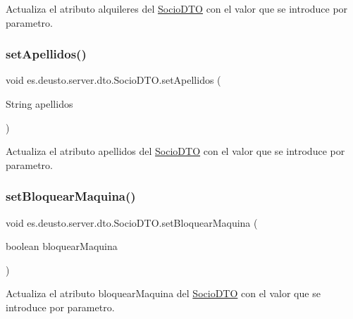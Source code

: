 Actualiza el atributo alquileres del \mbox{\hyperlink{classes_1_1deusto_1_1server_1_1dto_1_1_socio_d_t_o}{Socio\+D\+TO}} con el valor que se introduce por parametro. \mbox{\label{classes_1_1deusto_1_1server_1_1dto_1_1_socio_d_t_o_a16eb1e1b2b02afa38b38506b818a8786}} 
\subsubsection{\texorpdfstring{setApellidos()}{setApellidos()}}
{\footnotesize\ttfamily void es.\+deusto.\+server.\+dto.\+Socio\+D\+T\+O.\+set\+Apellidos (\begin{DoxyParamCaption}\item[{String}]{apellidos }\end{DoxyParamCaption})}

Actualiza el atributo apellidos del \mbox{\hyperlink{classes_1_1deusto_1_1server_1_1dto_1_1_socio_d_t_o}{Socio\+D\+TO}} con el valor que se introduce por parametro. \mbox{\label{classes_1_1deusto_1_1server_1_1dto_1_1_socio_d_t_o_a7e34b405a06d4e83fb65974691f6a9fb}} 
\subsubsection{\texorpdfstring{setBloquearMaquina()}{setBloquearMaquina()}}
{\footnotesize\ttfamily void es.\+deusto.\+server.\+dto.\+Socio\+D\+T\+O.\+set\+Bloquear\+Maquina (\begin{DoxyParamCaption}\item[{boolean}]{bloquear\+Maquina }\end{DoxyParamCaption})}

Actualiza el atributo bloquear\+Maquina del \mbox{\hyperlink{classes_1_1deusto_1_1server_1_1dto_1_1_socio_d_t_o}{Socio\+D\+TO}} con el valor que se introduce por parametro. \mbox{\label{classes_1_1deusto_1_1server_1_1dto_1_1_socio_d_t_o_a4c58785ebde0304cffe32dfbab8f6a75}} 
